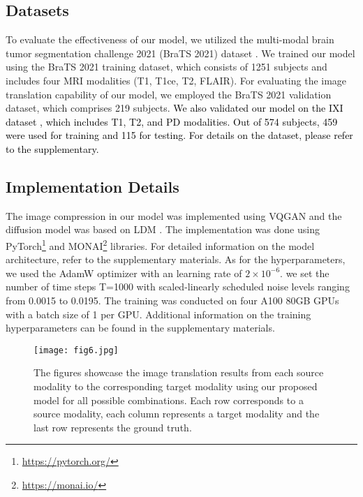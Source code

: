 \documentclass[10pt,twocolumn,letterpaper]{article}
\newcommand{\jhk}[2]{\textcolor{black}{{}#2}}
\begin{document}
\subsection{Datasets}
To evaluate the effectiveness of our model, we utilized the multi-modal brain tumor segmentation challenge 2021 (BraTS 2021) dataset \cite{baid2021rsna, bakas2017segmentation, bakas2017advancing, menze2014multimodal}. We trained our model using the BraTS 2021 training dataset, which consists of 1251 subjects and includes four MRI modalities (T1, T1ce, T2, FLAIR). For evaluating the image translation capability of our model, we employed the BraTS 2021 validation dataset, which comprises 219 subjects. \jhk{}{We also validated our model on the IXI dataset  \cite{ixi2018}, which includes T1, T2, and PD modalities. Out of 574 subjects, 459 were used for training and 115 for testing. For details on the dataset, please refer to the supplementary.}

\subsection{Implementation Details}
The image compression in our model was implemented using VQGAN \cite{esser2021taming} and the diffusion model was based on LDM \cite{rombach2022high}. The implementation was done using PyTorch\footnote{\url{https://pytorch.org/}} and MONAI\footnote{\url{https://monai.io/}} libraries. For detailed information on the model architecture, refer to the supplementary materials. As for the hyperparameters, we used the AdamW \cite{loshchilov2018decoupled} optimizer with an learning rate of $2\times10^{-6}$. 
we set the number of time steps T=1000 with scaled-linearly scheduled noise levels ranging from 0.0015 to 0.0195. The training was conducted on four A100 80GB GPUs with a batch size of 1 per GPU. Additional information on the training hyperparameters can be found in the supplementary materials.

\begin{figure*} [ht]
    \centerline{\texttt{[image: fig6.jpg]}}
    \vspace{-10pt}
    \caption{The figures showcase the image translation results from each source modality to the corresponding target modality using our proposed model for all possible combinations. Each row corresponds to a source modality, each column represents a target modality and the last row represents the ground truth.}
    \label{fig6}
\end{figure*}
\end{document}
